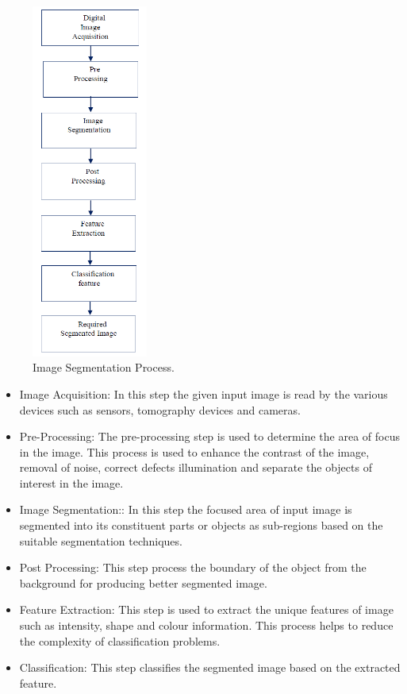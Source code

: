 \documentclass[two column]{ieeeaccess}
\begin{document}
\begin{figure}[h]
    \centering
    \includegraphics[width=1.5in]{segmentation.PNG}
    \caption{Image Segmentation Process.}
    \label{fig10}
\end{figure}
 
\begin{itemize}

    \item Image Acquisition: In this step the given input image is read by the various devices such as sensors, tomography devices and cameras.
    
    \item Pre-Processing: The pre-processing step is used to determine the area of focus in the image. This process is used to enhance the contrast of the image, removal of noise, correct defects illumination and separate the objects of interest in the image. 
    
    \item Image Segmentation:: In this step the focused area of input image is segmented into its constituent parts or objects as sub-regions based on the suitable segmentation techniques.
    
    \item Post Processing:  This step process the boundary of the object from the background for producing better segmented image.
    
    \item Feature Extraction: This step is used to extract the unique features of image such as intensity, shape and colour information. This process helps to reduce the complexity of classification problems.
    
    \item Classification: This step classifies the segmented image based on the extracted feature.
    
\end{itemize}
\end{document}

